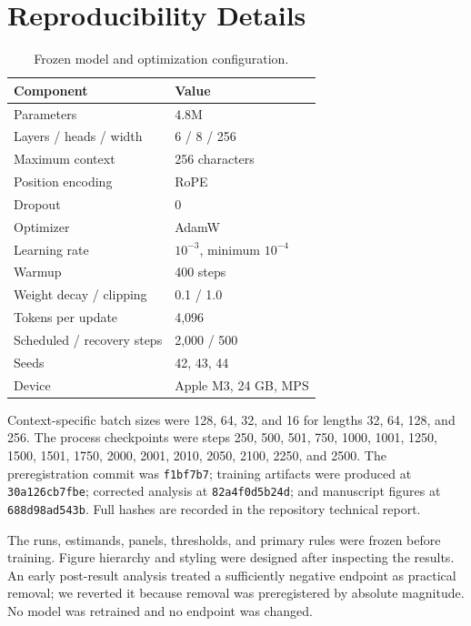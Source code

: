 \documentclass{article}
\begin{document}
\clearpage
\appendix
\onecolumn

\section{Reproducibility Details}
\label{app:repro}

\begin{table}[h]
\centering
\small
\caption{Frozen model and optimization configuration.}
\begin{tabular}{ll}
\toprule
Component & Value \\
\midrule
Parameters & 4.8M \\
Layers / heads / width & 6 / 8 / 256 \\
Maximum context & 256 characters \\
Position encoding & RoPE \\
Dropout & 0 \\
Optimizer & AdamW \\
Learning rate & $10^{-3}$, minimum $10^{-4}$ \\
Warmup & 400 steps \\
Weight decay / clipping & 0.1 / 1.0 \\
Tokens per update & 4,096 \\
Scheduled / recovery steps & 2,000 / 500 \\
Seeds & 42, 43, 44 \\
Device & Apple M3, 24 GB, MPS \\
\bottomrule
\end{tabular}
\end{table}

Context-specific batch sizes were 128, 64, 32, and 16 for lengths 32, 64, 128, and 256. The process checkpoints were steps 250, 500, 501, 750, 1000, 1001, 1250, 1500, 1501, 1750, 2000, 2001, 2010, 2050, 2100, 2250, and 2500. The preregistration commit was \texttt{f1bf7b7}; training artifacts were produced at \texttt{30a126cb7fbe}; corrected analysis at \texttt{82a4f0d5b24d}; and manuscript figures at \texttt{688d98ad543b}. Full hashes are recorded in the repository technical report.

The runs, estimands, panels, thresholds, and primary rules were frozen before training. Figure hierarchy and styling were designed after inspecting the results. An early post-result analysis treated a sufficiently negative endpoint as practical removal; we reverted it because removal was preregistered by absolute magnitude. No model was retrained and no endpoint was changed.
\end{document}

